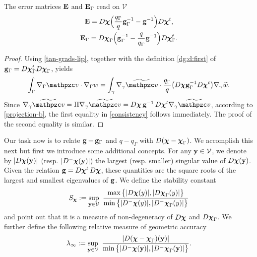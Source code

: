 \begin{lemma}\label{L:geom_consist}
The error matrices ${\bf E}$ and ${\bf E}_\Gamma$ read on $\mathcal{V}$
%
\begin{gather}
\label{error-matrix-g}
{\bf E} = D{\boldsymbol \chi} \Big(\frac{q_\Gamma}{q} {\bf g}_\Gamma^{-1} - {\bf g}^{-1} \Big) D{\boldsymbol \chi}^t,
\\
\label{error-matrix-G}
{\bf E}_\Gamma = D{\boldsymbol \chi}_\Gamma \Big({\bf g}_\Gamma^{-1} - \frac{q}{q_\Gamma}{\bf g}^{-1}
\Big) D{\boldsymbol \chi}_\Gamma^t.
\end{gather}
%
\end{lemma}
%
\begin{proof}
Using \eqref{tan-grads-lip}, together with the definition \eqref{dg:d:first} of
${\bf g}_\Gamma=D{\boldsymbol \chi}_\Gamma^t D{\boldsymbol \chi}_\Gamma$, yields
%
\[
\int_\Gamma \nabla_\Gamma \tv\cdot\nabla_\Gamma w =
\int_\gamma \nabla_\gamma \ttv \cdot
\frac{q_\Gamma}{q}\big( D\bchi\bg_\Gamma^{-1} D\bchi^t \big) \nabla_\gamma \widetilde w.
\]
%
Since $\nabla_\gamma \widetilde \tv=\Pi\nabla_\gamma \widetilde \tv=D\bchi \, \bg^{-1} \, D\bchi^t\nabla_\gamma \widetilde \tv$, according to
\eqref{projection-b}, the first equality in \eqref{consistency} follows
immediately. The proof of the second equality is similar.
\end{proof}

Our task now is to relate  ${\bf g}-{\bf g}_\Gamma$ and $q-q_\Gamma$
with $D({\boldsymbol \chi}-{\boldsymbol \chi}_\Gamma)$. We accomplish this next but first we introduce some
additional concepts. For any ${\bf y}\in\mathcal{V}$, we denote by $|D{\boldsymbol \chi}({\bf y})|$
(resp. $|D^-{\boldsymbol \chi}({\bf y})|$) the largest (resp. smaller) singular value of $D{\boldsymbol \chi}({\bf y})$.
Given the relation ${\bf g} = D{\boldsymbol \chi}^t \, D{\boldsymbol \chi}$, these quantities are the square
roots of the largest and smallest eigenvalues of ${\bf g}$. We define the
stability constant
%
\begin{equation}\label{stab-const}
S_{\boldsymbol \chi} := \sup_{{\bf y}\in\mathcal{V}} ~
\frac{\max\big\{|D{\boldsymbol \chi}(y)|,|D{\boldsymbol \chi}_\Gamma(y)|\big\}}{\min\big\{|D^-{\boldsymbol \chi}(y)|,|D^-{\boldsymbol \chi}_\Gamma(y)|\big\}}
\end{equation}
%
and point out that it is a measure of non-degeneracy of $D{\boldsymbol \chi}$ and $D{\boldsymbol \chi}_\Gamma$.
We further define the following relative measure of geometric accuracy
%
\begin{equation}\label{geo-est}
  \lambda_\infty := \sup_{{\bf y}\in\mathcal{V}} ~
  \frac{|D({\boldsymbol \chi}-{\boldsymbol \chi}_\Gamma)({\bf y})|}{\min\big\{|D^-{\boldsymbol \chi}({\bf y})|,|D^-{\boldsymbol \chi}_\Gamma({\bf y})|\big\}}.
\end{equation}  

